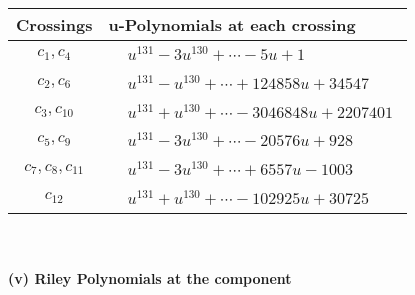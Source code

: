\documentclass[1p]{elsarticle_modified}
\theoremstyle{definition}
\begin{document}
\begin{tabular}{m{50pt}|m{274pt}}
Crossings & \hspace{64pt}u-Polynomials at each crossing \\
\hline $$\begin{aligned}c_{1},c_{4}\end{aligned}$$&$\begin{aligned}
&u^{131}-3 u^{130}+\cdots-5 u+1
\end{aligned}$\\
\hline $$\begin{aligned}c_{2},c_{6}\end{aligned}$$&$\begin{aligned}
&u^{131}- u^{130}+\cdots+124858 u+34547
\end{aligned}$\\
\hline $$\begin{aligned}c_{3},c_{10}\end{aligned}$$&$\begin{aligned}
&u^{131}+u^{130}+\cdots-3046848 u+2207401
\end{aligned}$\\
\hline $$\begin{aligned}c_{5},c_{9}\end{aligned}$$&$\begin{aligned}
&u^{131}-3 u^{130}+\cdots-20576 u+928
\end{aligned}$\\
\hline $$\begin{aligned}c_{7},c_{8},c_{11}\end{aligned}$$&$\begin{aligned}
&u^{131}-3 u^{130}+\cdots+6557 u-1003
\end{aligned}$\\
\hline $$\begin{aligned}c_{12}\end{aligned}$$&$\begin{aligned}
&u^{131}+u^{130}+\cdots-102925 u+30725
\end{aligned}$\\
\hline
\end{tabular}\\~\\
\newpage\renewcommand{\arraystretch}{1}
\flushleft \textbf{(v) Riley Polynomials at the component}\newline \\
\end{document}

